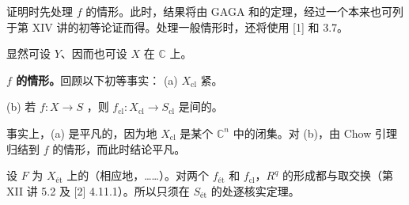 证明时先处理 $f$ 的情形。此时，结果将由 GAGA 和的定理，经过一个本来也可列于第 XIV 讲的初等论证而得。处理一般情形时，还将使用 [1] 和 3.7。

显然可设 $Y$、因而也可设 $X$ 在 $\mathbb C$ 上。

\textbf{$f$ 的情形。}回顾以下初等事实：
(a)  $X_{\mathrm{cl}}$ 紧。

(b) 若 $f:X\to S$ ，则 $f_{\mathrm{cl}}:X_{\mathrm{cl}}\to S_{\mathrm{cl}}$ 是间的。

事实上，(a) 是平凡的，因为地 $X_{\mathrm{cl}}$ 是某个 $\mathbb C^n$ 中的闭集。对 (b)，由 Chow 引理归结到 $f$ 的情形，而此时结论平凡。

设 $F$ 为 $X_{\text{ét}}$ 上的（相应地，……）。对两个 $f_{\text{ét}}$ 和 $f_{\mathrm{cl}}$，$R^q$ 的形成都与取交换（第 XII 讲 5.2 及 [2] 4.11.1）。所以只须在 $S_{\text{ét}}$ 的处逐核实定理。

